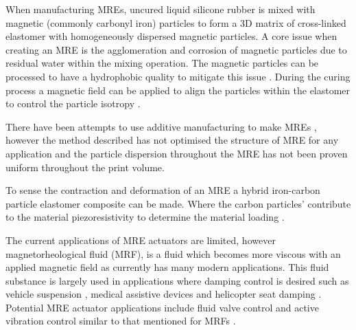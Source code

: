 When manufacturing MREs, uncured liquid silicone rubber is mixed with magnetic (commonly carbonyl iron) particles to form a 3D matrix of cross-linked elastomer with homogeneously dispersed magnetic particles. A core issue when creating an MRE is the agglomeration and corrosion of magnetic particles due to residual water within the mixing operation. The magnetic particles can be processed to have a hydrophobic quality to mitigate this issue \cite{Burhannuddin2020,Ge2020}. During the curing process a magnetic field can be applied to align the particles within the elastomer to control the particle isotropy \cite{Ge2020,LaleganiDezaki2023}.

There have been attempts to use additive manufacturing to make MREs \citep{Krueger2014,Ge2020}, however the method described has not optimised the structure of MRE for any application and the particle dispersion throughout the MRE has not been proven uniform throughout the print volume. 

To sense the contraction and deformation of an MRE a hybrid iron-carbon particle elastomer composite can be made. Where the carbon particles' contribute to the material piezoresistivity to determine the material loading \cite{Bica2011,Costi2024}. 

The current applications of MRE actuators are limited, however magnetorheological fluid (MRF), is a fluid which becomes more viscous with an applied magnetic field as currently has many modern applications. This fluid substance is largely used in applications where damping control is desired such as vehicle suspension \citep{UnuhH2019}, medical assistive devices \citep{Chen2017} and helicopter seat damping \citep{Hiemenz2007}. Potential MRE actuator applications include fluid valve control \citep{Bose2012} and active vibration control similar to that mentioned for MRFs \citep{UnuhH2019}. 


